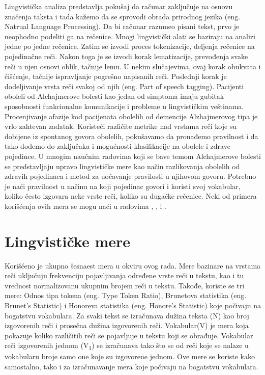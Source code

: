 \documentclass[12pt,oneside]{memoir}
\begin{document}
Lingvistička analiza predstavlja pokušaj da računar zaključuje na osnovu značenja taksta i tada kažemo da se sprovodi obrada prirodnog jezika (eng. Natrual Language Processing).  Da bi računar razumeo pisani tekst,  prvo je neophodno podeliti ga na rečenice.  Mnogi lingvistički alati se baziraju na analizi jedne po jedne rečenice.  Zatim se izvodi proces tokenizacije,  deljenja rečenice na pojedinačne reči.  Nakon toga je se izvodi korak lematizacije,  prevođenja svake reči u njen osnovi oblik, tačnije lemu.  U nekim slučajevima,  ovaj korak obukvata i čišćenje, tačnije ispravljanje pogrešno napisanih reči.  Poslednji korak je dodeljivanje vrsta reči svakoj od njih (eng. Part of speech tagging). 
Pacijenti oboleli od Alchajmerove bolesti kao jedan od simptoma imaju gubitak sposobnosti funkcionalne komunikacije i probleme u lingvističkim veštinama.  Procenjivanje afazije kod pacijenata obolelih od demencije Alzhajmerovog tipa je vrlo zahtevan zadatak.  Koristeći različite metrike nad vrstama reči koje su dobijene iz spontanog govora obolelih,  pokušavamo da pronađemo pravilnost i da tako dođemo do zaključaka i mogućnosti klasifikacije na obolele i zdrave pojedince.  
U mnogim naučnim radovima koji se bave temom Alchajmerove bolesti se predstavljaju upravo lingvističke mere kao način razlikovanja obolelih od zdravih pojedinaca i metod za uočavanje pravilosti u njihovom govoru. Potrebno je naći pravilnost u načinu na koji pojedinac govori i koristi svoj vokabular, koliko često izgovara neke vrste reči,  koliko su dugačke rečenice.  Neki od primera korišćenja ovih mera se mogu naći u radovima , \cite{automaticdetandrat}, \cite{Evaloftechfolexicalperformance} i \cite{linguisticfeatures}.

\section{Lingvističke mere}

Korišćeno je ukupno šesnaest mera u okviru ovog rada.  Mere bazinare na vrstama reči uključuju frekvenciju pojavljivanja određene vrste reči u tekstu, kao i tu vrednost normalizovanu ukupnim brojem reči u tekstu. Takođe,  koriste se tri mere: Odnos tipa tokena (eng.  Type Token Ratio),  Brunetova statistika (eng. Brunet's Statistic) i Honoreva statistika (eng.  Honore's Statistic) koje počivaju na bogatstvu vokabulara. 
Za svaki tekst se izračunava dužina teksta (N) kao broj izgovorenih reči i prosečna dužina izgovorenih reči.  Vokabular(V) je mera koja pokazuje koliko različitih reči se pojavljuje u tekstu koji se obrađuje.  Vokabular reči izgovorenih jednom (V\textsubscript{1}) se izračunava tako što se od reči koje se nalaze u vokabularu broje samo one koje su izgovorene jednom.  Ove mere se koriste kako samostalno, tako i za izračunavanje mera koje počivaju na bogatstvu vokabulara. 
\break
\end{document}
